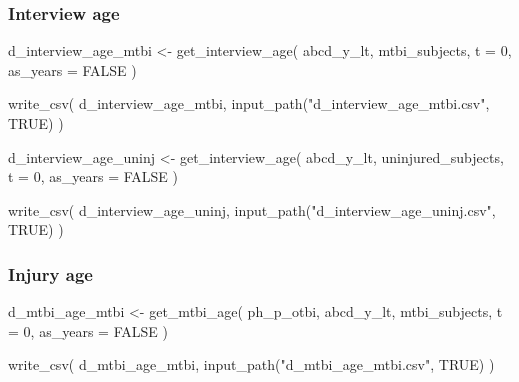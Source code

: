 \documentclass[
  letterpaper,
  DIV=11,
  numbers=noendperiod]{scrreprt}
\newenvironment{Shaded}{\begin{snugshade}}{\end{snugshade}}
\newcommand{\AttributeTok}[1]{\textcolor[rgb]{0.40,0.45,0.13}{#1}}
\newcommand{\ConstantTok}[1]{\textcolor[rgb]{0.56,0.35,0.01}{#1}}
\newcommand{\DecValTok}[1]{\textcolor[rgb]{0.68,0.00,0.00}{#1}}
\newcommand{\FunctionTok}[1]{\textcolor[rgb]{0.28,0.35,0.67}{#1}}
\newcommand{\NormalTok}[1]{\textcolor[rgb]{0.00,0.23,0.31}{#1}}
\newcommand{\OtherTok}[1]{\textcolor[rgb]{0.00,0.23,0.31}{#1}}
\newcommand{\StringTok}[1]{\textcolor[rgb]{0.13,0.47,0.30}{#1}}
\begin{document}
\subsubsection{Interview age}\label{interview-age}

\begin{Shaded}
\begin{Highlighting}[]
\NormalTok{d\_interview\_age\_mtbi }\OtherTok{\textless{}{-}} \FunctionTok{get\_interview\_age}\NormalTok{(}
\NormalTok{    abcd\_y\_lt,}
\NormalTok{    mtbi\_subjects,}
    \AttributeTok{t =} \DecValTok{0}\NormalTok{,}
    \AttributeTok{as\_years =} \ConstantTok{FALSE}
\NormalTok{)}

\FunctionTok{write\_csv}\NormalTok{(}
\NormalTok{    d\_interview\_age\_mtbi,}
    \FunctionTok{input\_path}\NormalTok{(}\StringTok{"d\_interview\_age\_mtbi.csv"}\NormalTok{, }\ConstantTok{TRUE}\NormalTok{)}
\NormalTok{)}

\NormalTok{d\_interview\_age\_uninj }\OtherTok{\textless{}{-}} \FunctionTok{get\_interview\_age}\NormalTok{(}
\NormalTok{    abcd\_y\_lt,}
\NormalTok{    uninjured\_subjects,}
    \AttributeTok{t =} \DecValTok{0}\NormalTok{,}
    \AttributeTok{as\_years =} \ConstantTok{FALSE}
\NormalTok{)}

\FunctionTok{write\_csv}\NormalTok{(}
\NormalTok{    d\_interview\_age\_uninj,}
    \FunctionTok{input\_path}\NormalTok{(}\StringTok{"d\_interview\_age\_uninj.csv"}\NormalTok{, }\ConstantTok{TRUE}\NormalTok{)}
\NormalTok{)}
\end{Highlighting}
\end{Shaded}

\subsubsection{Injury age}\label{injury-age}

\begin{Shaded}
\begin{Highlighting}[]
\NormalTok{d\_mtbi\_age\_mtbi }\OtherTok{\textless{}{-}} \FunctionTok{get\_mtbi\_age}\NormalTok{(}
\NormalTok{    ph\_p\_otbi,}
\NormalTok{    abcd\_y\_lt,}
\NormalTok{    mtbi\_subjects,}
    \AttributeTok{t =} \DecValTok{0}\NormalTok{,}
    \AttributeTok{as\_years =} \ConstantTok{FALSE}
\NormalTok{)}

\FunctionTok{write\_csv}\NormalTok{(}
\NormalTok{    d\_mtbi\_age\_mtbi,}
    \FunctionTok{input\_path}\NormalTok{(}\StringTok{"d\_mtbi\_age\_mtbi.csv"}\NormalTok{, }\ConstantTok{TRUE}\NormalTok{)}
\NormalTok{)}
\end{Highlighting}
\end{Shaded}
\end{document}
